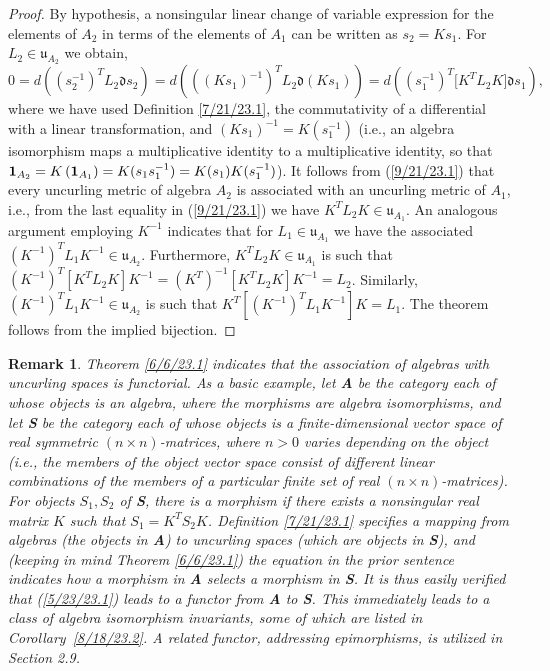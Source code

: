 \documentclass{amsart}
\numberwithin{equation}{section}
\newtheorem{remark}[theorem]{Remark}
\theoremstyle{definition}
\numberwithin{theorem}{section}
\begin{document}
\begin{proof} By hypothesis, a nonsingular linear change of variable expression for the elements of $A_2$ in terms of the elements of $A_1$ can be written as $s_2= Ks_1$. \mbox{For $L_2\in \mathfrak{u}_{A_2}$} we obtain, \begin{equation} 0 = d\left((s_2^{-1})^T L_2 \mathfrak{d}s_2\right) =  d\left(((Ks_1)^{-1})^T L_2 \mathfrak{d}(Ks_1)\right) = d\left((s_1^{-1})^T \big[K^T L_2K\big]\mathfrak{d}s_1\right), \label{9/21/23.1}  \end{equation} where we have used Definition \ref{7/21/23.1}, the commutativity of a differential with a linear transformation, and $(Ks_1)^{-1} = K(s_1^{-1})$ (i.e., an algebra isomorphism maps a multiplicative identity to a multiplicative identity, so that ${\bf 1}_{A_2} = K\left(\mathbf{1}_{A_1}\right) = K(s_1s_1^{-1}) = K(s_1)K(s_1^{-1})$).  It follows from (\ref{9/21/23.1}) that every uncurling metric  of algebra $A_2$ is associated with an uncurling metric of $A_1$, i.e., from the last equality in (\ref{9/21/23.1}) we have  $K^TL_2K\in\mathfrak{u}_{A_1}$.  An analogous argument employing $K^{-1}$ indicates that for $L_1\in\mathfrak{u}_{A_1}$ we have the associated $(K^{-1})^T L_1 K^{-1} \in \mathfrak{u}_{A_2}$.    Furthermore, $K^T L_2K\in\mathfrak{u}_{A_1}$ is such that $(K^{-1})^T [K^T L_2 K]K^{-1} = (K^T)^{-1} [K^T L_2 K]K^{-1} = L_2$.  Similarly, $(K^{-1})^T L_1K^{-1}\in\mathfrak{u}_{A_2}$ is such that $K^T[(K^{-1})^T L_1K^{-1}] K = L_1$.  The theorem follows from the implied bijection. 
\end{proof}

\begin{remark} \label{3/31/24.1} {\rm Theorem \ref{6/6/23.1} indicates that the association of algebras with uncurling spaces is functorial.  As a basic example, let {\bf A} be the category each of whose objects is an algebra, where the morphisms are algebra isomorphisms, and let {\bf S} be the category each of whose objects is a finite-dimensional vector space of real symmetric $(n\times n)$-matrices, where $n>0$ varies depending on the object (i.e., the members of the object vector space consist of different linear combinations of the members of a particular finite set of real $(n\times n)$-matrices).  For objects $S_1,S_2$ of {\bf S}, there is a morphism if there exists a nonsingular real matrix $K$ such that \mbox{$S_1  = K^T  S_2 K$.}    Definition \ref{7/21/23.1} specifies a mapping from algebras (the objects in {\bf A}) to uncurling spaces (which are objects in {\bf S}), and (keeping in mind Theorem \ref{6/6/23.1}) the equation in the prior sentence indicates how a morphism in {\bf A} selects a morphism in {\bf S}.  It is thus easily verified that (\ref{5/23/23.1}) leads to a functor from {\bf A} to {\bf S}.  This immediately leads to a class of algebra isomorphism invariants, some of which are listed in  \mbox{Corollary \ref{8/18/23.2}}.  A related functor, addressing epimorphisms, is utilized in Section 2.9}. \end{remark}
\end{document}

